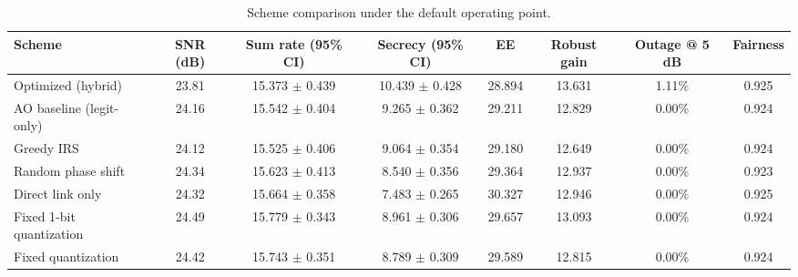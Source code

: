 \begin{table}[t]
\caption{Scheme comparison under the default operating point.}
\label{tab:comparison}
\centering
\begin{tabular}{lccccccc}
\hline
Scheme & SNR (dB) & Sum rate (95\% CI) & Secrecy (95\% CI) & EE & Robust gain & Outage @ 5 dB & Fairness \\
\hline
Optimized (hybrid) & 23.81 & 15.373 $\pm$ 0.439 & 10.439 $\pm$ 0.428 & 28.894 & 13.631 & 1.11\% & 0.925 \\
AO baseline (legit-only) & 24.16 & 15.542 $\pm$ 0.404 & 9.265 $\pm$ 0.362 & 29.211 & 12.829 & 0.00\% & 0.924 \\
Greedy IRS & 24.12 & 15.525 $\pm$ 0.406 & 9.064 $\pm$ 0.354 & 29.180 & 12.649 & 0.00\% & 0.924 \\
Random phase shift & 24.34 & 15.623 $\pm$ 0.413 & 8.540 $\pm$ 0.356 & 29.364 & 12.937 & 0.00\% & 0.923 \\
Direct link only & 24.32 & 15.664 $\pm$ 0.358 & 7.483 $\pm$ 0.265 & 30.327 & 12.946 & 0.00\% & 0.925 \\
Fixed 1-bit quantization & 24.49 & 15.779 $\pm$ 0.343 & 8.961 $\pm$ 0.306 & 29.657 & 13.093 & 0.00\% & 0.924 \\
Fixed quantization & 24.42 & 15.743 $\pm$ 0.351 & 8.789 $\pm$ 0.309 & 29.589 & 12.815 & 0.00\% & 0.924 \\
\hline
\end{tabular}
\end{table}
